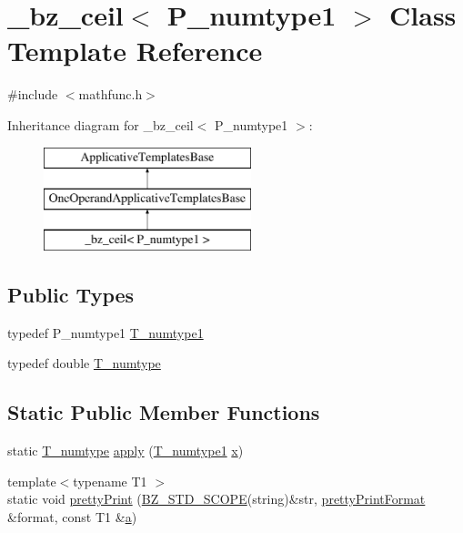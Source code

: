\hypertarget{class__bz__ceil}{}\section{\+\_\+bz\+\_\+ceil$<$ P\+\_\+numtype1 $>$ Class Template Reference}
\label{class__bz__ceil}


{\ttfamily \#include $<$mathfunc.\+h$>$}

Inheritance diagram for \+\_\+bz\+\_\+ceil$<$ P\+\_\+numtype1 $>$\+:\begin{figure}[H]
\begin{center}
\leavevmode
\includegraphics[height=3.000000cm]{class__bz__ceil}
\end{center}
\end{figure}
\subsection*{Public Types}
\begin{DoxyCompactItemize}
\item 
typedef P\+\_\+numtype1 \hyperlink{class__bz__ceil_a41e5950b3b761e833b9326afc77814f5}{T\+\_\+numtype1}
\item 
typedef double \hyperlink{class__bz__ceil_ae4c853d2c84a155afd5ca635dc0b0ae4}{T\+\_\+numtype}
\end{DoxyCompactItemize}
\subsection*{Static Public Member Functions}
\begin{DoxyCompactItemize}
\item 
static \hyperlink{class__bz__ceil_ae4c853d2c84a155afd5ca635dc0b0ae4}{T\+\_\+numtype} \hyperlink{class__bz__ceil_aa55d277764f306d29d10328aaefbb54c}{apply} (\hyperlink{class__bz__ceil_a41e5950b3b761e833b9326afc77814f5}{T\+\_\+numtype1} \hyperlink{vecnorm1_8cc_ac73eed9e41ec09d58f112f06c2d6cb63}{x})
\item 
{\footnotesize template$<$typename T1 $>$ }\\static void \hyperlink{class__bz__ceil_a7f607190a510082012066ef9f7ae1402}{pretty\+Print} (\hyperlink{numinquire_8h_a2b24ffc3b4ef9803956bc7715c6c7b83}{B\+Z\+\_\+\+S\+T\+D\+\_\+\+S\+C\+O\+P\+E}(string)\&str, \hyperlink{classprettyPrintFormat}{pretty\+Print\+Format} \&format, const T1 \&\hyperlink{gen__mat5files_8m_aae328bf20413f220e38aec4d95bfd6da}{a})
\end{DoxyCompactItemize}


